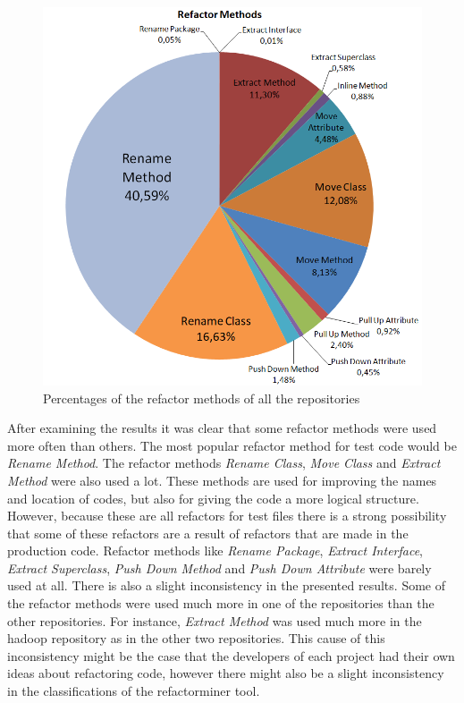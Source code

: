 \begin{figure}[h!]
 \centering
 \includegraphics[width=\linewidth]{resources/refactorMethods.PNG}
 \caption{Percentages of the refactor methods of all the repositories}
 \label{figure:piechart}
\end{figure}


After examining the results it was clear that some refactor methods were used more often than others. The most popular refactor method for test code would be \textit{Rename Method}. The refactor methods \textit{Rename Class}, \textit{Move Class} and \textit{Extract Method} were also used a lot. These methods are used for improving the names and location of codes, but also for giving the code a more logical structure. However, because these are all refactors for test files there is a strong possibility that some of these refactors are a result of refactors that are made in the production code. Refactor methods like \textit{Rename Package}, \textit{Extract Interface}, \textit{Extract Superclass}, \textit{Push Down Method} and \textit{Push Down Attribute} were barely used at all. There is also a slight inconsistency in the presented results. Some of the refactor methods were used much more in one of the repositories than the other repositories. For instance, \textit{Extract Method} was used much more in the hadoop repository as in the other two repositories. This cause of this inconsistency might be the case that the developers of each project had their own ideas about refactoring code, however there might also be a slight inconsistency in the classifications of the refactorminer tool.

